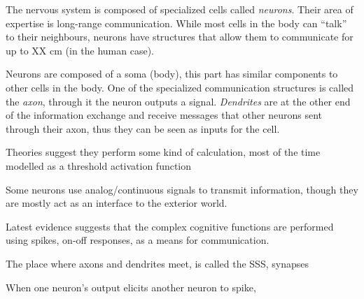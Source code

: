 The nervous system is composed of specialized cells called \emph{neurons}. Their area of expertise is long-range communication. While most cells in the body can ``talk'' to their neighbours, neurons have structures that allow them to communicate for up to XX cm (in the human case).

Neurons are composed of a soma (body), this part has similar components to other cells in the body. One of the specialized communication structures is called the \emph{axon}, through it the neuron outputs a signal. \emph{Dendrites} are at the other end of the information exchange and receive messages that other neurons sent through their axon, thus they can be seen as inputs for the cell.

Theories suggest they perform some kind of calculation, most of the time modelled as a threshold activation function

Some neurons use analog/continuous signals to transmit information, though they are mostly act as an interface to the exterior world.

Latest evidence suggests that the complex cognitive functions are performed using spikes, on-off responses, as a means for communication.

The place where axons and dendrites meet, is called the SSS, synapses

When one neuron's output elicits another neuron to spike, 

